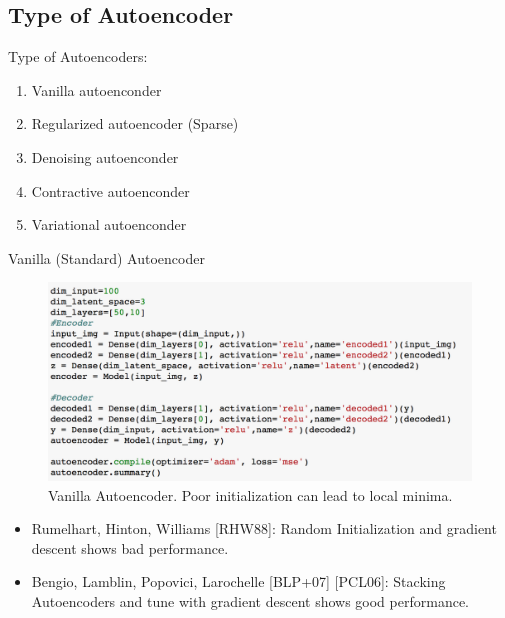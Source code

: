 \documentclass[xcolor=pdftex,dvipsnames,table,mathserif]{beamer}
\begin{document}
\subsection{Type of Autoencoder}
\begin{frame}{Type of Autoencoders:}
\begin{enumerate}
\item Vanilla autoenconder
\item Regularized autoencoder (Sparse)
\item Denoising autoenconder
\item Contractive autoenconder
\item Variational autoenconder
\end{enumerate}
\end{frame}

\begin{frame}{Vanilla (Standard) Autoencoder}
\begin{figure}
\includegraphics[width=.8\columnwidth]{../graphics/StandardAutoencoder}
\caption{Vanilla Autoencoder.  Poor initialization can lead to local minima.}
\end{figure}
\begin{itemize}
\item Rumelhart, Hinton, Williams [RHW88]: Random Initialization and gradient descent shows bad performance.
\item Bengio, Lamblin, Popovici, Larochelle [BLP+07] [PCL06]: Stacking Autoencoders and tune with gradient descent shows good performance.
\end{itemize}
\end{frame}
\end{document}
